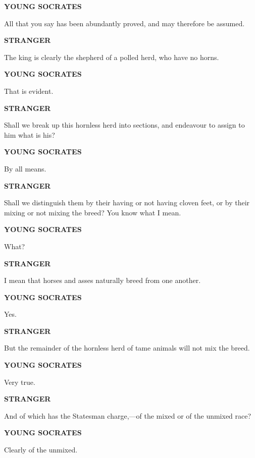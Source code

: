 \documentclass[11pt,letter]{article}
\begin{document}
\par \textbf{YOUNG SOCRATES}
\par   All that you say has been abundantly proved, and may therefore be assumed.

\par \textbf{STRANGER}
\par   The king is clearly the shepherd of a polled herd, who have no horns.

\par \textbf{YOUNG SOCRATES}
\par   That is evident.

\par \textbf{STRANGER}
\par   Shall we break up this hornless herd into sections, and endeavour to assign to him what is his?

\par \textbf{YOUNG SOCRATES}
\par   By all means.

\par \textbf{STRANGER}
\par   Shall we distinguish them by their having or not having cloven feet, or by their mixing or not mixing the breed? You know what I mean.

\par \textbf{YOUNG SOCRATES}
\par   What?

\par \textbf{STRANGER}
\par   I mean that horses and asses naturally breed from one another.

\par \textbf{YOUNG SOCRATES}
\par   Yes.

\par \textbf{STRANGER}
\par   But the remainder of the hornless herd of tame animals will not mix the breed.

\par \textbf{YOUNG SOCRATES}
\par   Very true.

\par \textbf{STRANGER}
\par   And of which has the Statesman charge,—of the mixed or of the unmixed race?

\par \textbf{YOUNG SOCRATES}
\par   Clearly of the unmixed.
\end{document}
